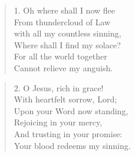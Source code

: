 



\begin{verse}
1. Oh where shall I now flee\\
From thundercloud of Law\\
with all my countless sinning,\\
Where shall I find my solace?\\
For all the world together\\
Cannot relieve my anguish.
\end{verse}

\begin{verse}
2. O Jesus, rich in grace!\\
With heartfelt sorrow, Lord;\\
Upon your Word now standing,\\
Rejoicing in your mercy,\\
And trusting in your promise:\\
Your blood redeems my sinning.
\end{verse}

